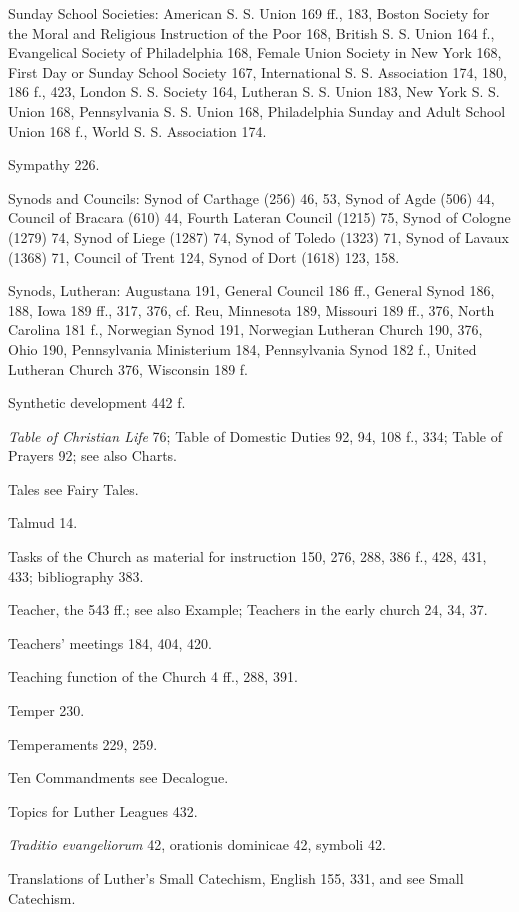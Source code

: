 Sunday School Societies: American S. S. Union 169 ff., 183, Boston Society for the Moral and Religious Instruction of the Poor 168, British S. S. Union 164 f., Evangelical Society of Philadelphia 168, Female Union Society in New York 168, First Day or Sunday School Society 167, International S. S. Association 174, 180, 186 f., 423, London S. S. Society 164, Lutheran S. S. Union 183, New York S. S. Union 168, Pennsylvania S. S. Union 168, Philadelphia Sunday and Adult School Union 168 f., World S. S. Association 174.

Sympathy 226.

Synods and Councils: Synod of Carthage (256) 46, 53, Synod of Agde (506) 44, Council of Bracara (610) 44, Fourth Lateran Council (1215) 75, Synod of Cologne (1279) 74, Synod of Liege (1287) 74, Synod of Toledo (1323) 71, Synod of Lavaux (1368) 71, Council of Trent 124, Synod of Dort (1618) 123, 158.

Synods, Lutheran: Augustana 191, General Council 186 ff., General Synod 186, 188, Iowa 189 ff., 317, 376, cf. Reu, Minnesota 189, Missouri 189 ff., 376, North Carolina 181 f., Norwegian Synod 191, Norwegian Lutheran Church 190, 376, Ohio 190, Pennsylvania Ministerium 184, Pennsylvania Synod 182 f., United Lutheran Church 376, Wisconsin 189 f.

Synthetic development 442 f.

\emph{Table of Christian Life} 76; Table of Domestic Duties 92, 94, 108 f., 334; Table of Prayers 92; see also Charts.

Tales see Fairy Tales.

Talmud 14.

Tasks of the Church as material for instruction 150, 276, 288, 386 f., 428, 431, 433; bibliography 383.

Teacher, the 543 ff.; see also Example; Teachers in the early church 24, 34, 37.

Teachers’ meetings 184, 404, 420.

Teaching function of the Church 4 ff., 288, 391.

Temper 230.

Temperaments 229, 259.

Ten Commandments see Decalogue.

Topics for Luther Leagues 432.

\emph{Traditio evangeliorum} 42, orationis dominicae 42, symboli 42.

Translations of Luther’s Small Catechism, English 155, 331, and see Small Catechism.

